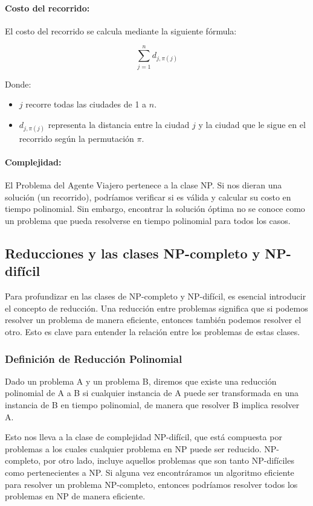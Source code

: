 \documentclass[12pt,titlepage,twoside,openright]{book}
\begin{document}
\paragraph{Costo del recorrido:}
El costo del recorrido se calcula mediante la siguiente f\'ormula:

\[
	\sum_{j=1}^n d_{j,\pi(j)}
\]

Donde:
\begin{itemize}
	\item $j$ recorre todas las ciudades de 1 a $n$.
	\item $d_{j,\pi(j)}$ representa la distancia entre la ciudad $j$ y la ciudad que le sigue en el recorrido seg\'un la permutaci\'on $\pi$.
\end{itemize}

\paragraph{Complejidad:}
El Problema del Agente Viajero pertenece a la clase NP. Si nos dieran una soluci\'on (un recorrido), podr\'iamos verificar si es v\'alida y calcular su costo en tiempo polinomial. Sin embargo, encontrar la soluci\'on \'optima no se conoce como un problema que pueda resolverse en tiempo polinomial para todos los casos.

\subsection{Reducciones y las clases NP-completo y NP-dif\'icil}

Para profundizar en las clases de NP-completo y NP-dif\'icil, es esencial introducir el concepto de reducci\'on. Una reducci\'on entre problemas significa que si podemos resolver un problema de manera eficiente, entonces tambi\'en podemos resolver el otro. Esto es clave para entender la relaci\'on entre los problemas de estas clases.

\subsubsection{Definici\'on de Reducci\'on Polinomial}

Dado un problema A y un problema B, diremos que existe una reducci\'on polinomial de A a B si cualquier instancia de A puede ser transformada en una instancia de B en tiempo polinomial, de manera que resolver B implica resolver A.

Esto nos lleva a la clase de complejidad NP-dif\'icil, que est\'a compuesta por problemas a los cuales cualquier problema en NP puede ser reducido. NP-completo, por otro lado, incluye aquellos problemas que son tanto NP-dif\'iciles como pertenecientes a NP. Si alguna vez encontr\'aramos un algoritmo eficiente para resolver un problema NP-completo, entonces podr\'iamos resolver todos los problemas en NP de manera eficiente.
\end{document}
